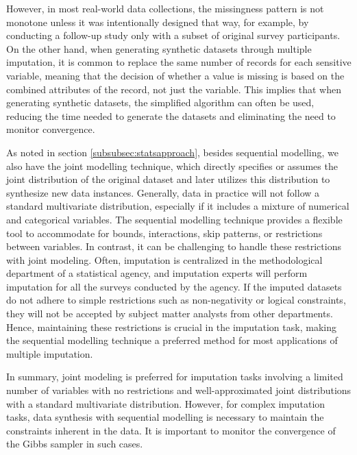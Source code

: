 However, in most real-world data collections, the missingness pattern is not monotone unless it was intentionally designed that way, for example, by conducting a follow-up study only with a subset of original survey participants. On the other hand, when generating synthetic datasets through multiple imputation, it is common to replace the same number of records for each sensitive variable, meaning that the decision of whether a value is missing is based on the combined attributes of the record, not just the variable. This implies that when generating synthetic datasets, the simplified algorithm can often be used, reducing the time needed to generate the datasets and eliminating the need to monitor convergence.

As noted in section \ref{subsubsec:statsapproach}, besides sequential modelling, we also have the joint modelling technique, which directly specifies or assumes the joint distribution of the original dataset and later utilizes this distribution to synthesize new data instances. Generally, data in practice will not follow a standard multivariate distribution, especially if it includes a mixture of numerical and categorical variables. The sequential modelling technique provides a flexible tool to accommodate for bounds, interactions, skip patterns, or restrictions between variables. In contrast, it can be challenging to handle these restrictions with joint modeling. Often, imputation is centralized in the methodological department of a statistical agency, and imputation experts will perform imputation for all the surveys conducted by the agency. If the imputed datasets do not adhere to simple restrictions such as non-negativity or logical constraints, they will not be accepted by subject matter analysts from other departments. Hence, maintaining these restrictions is crucial in the imputation task, making the sequential modelling technique a preferred method for most applications of multiple imputation.

In summary, joint modeling is preferred for imputation tasks involving a limited number of variables with no restrictions and well-approximated joint distributions with a standard multivariate distribution. However, for complex imputation tasks, data synthesis with sequential modelling is necessary to maintain the constraints inherent in the data. It is important to monitor the convergence of the Gibbs sampler in such cases.







